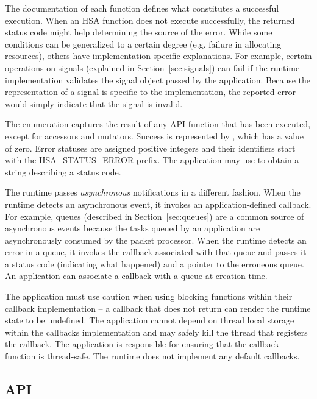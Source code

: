 \documentclass[oneside]{book}
\newcommand{\reftyp}[1]{#1}
\newcommand{\refenu}[1]{\reftyp{#1}}
\begin{document}
The documentation of each function defines what constitutes a successful
execution. When an HSA function does not execute successfully, the returned
status code might help determining the source of the error. While some
conditions can be generalized to a certain degree (e.g. failure in allocating
resources), others have implementation-specific explanations. For
example, certain operations on signals (explained in Section~\ref{sec:signals})
can fail if the runtime implementation validates the signal object passed by
the application. Because the representation of a signal is specific to the
implementation, the reported error would simply indicate that the signal is
invalid.

The  enumeration captures the result of any API function
that has been executed, except for accessors and mutators. Success is
represented by , which has a value of zero. Error
statuses are assigned positive integers and their identifiers start with the
\refenu{HSA_STATUS_ERROR} prefix. The application may use
 to obtain a string describing a status code.

The runtime passes \textit{asynchronous} notifications in a different fashion.
When the runtime detects an asynchronous event, it invokes an
application-defined callback. For example, queues (described in
Section~\ref{sec:queues}) are a common source of asynchronous events because the
tasks queued by an application are asynchronously consumed by the packet
processor. When the runtime detects an error in a queue, it invokes the callback
associated with that queue and passes it a status code (indicating what
happened) and a pointer to the erroneous queue. An application can associate a
callback with a queue at creation time.

The application must use caution when using blocking functions within their
callback implementation -- a callback that does not return can render the
runtime state to be undefined. The application cannot depend on thread local
storage within the callbacks implementation and may safely kill the thread that
registers the callback. The application is responsible for ensuring that
the callback function is thread-safe. The runtime does not implement any default
callbacks.

\subsection{API}

\end{document}
